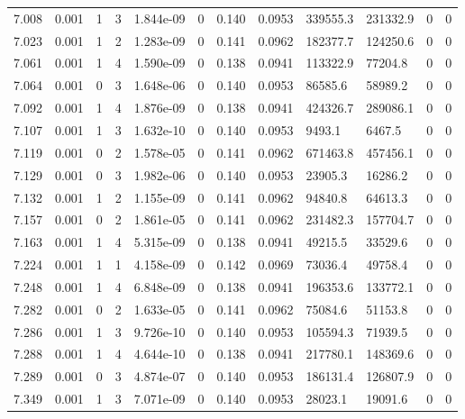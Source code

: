 \documentclass[preview]{standalone}
\begin{document}
{{{{{{{{{{\begin{tabular}{L{1.2cm}C{1.2cm} C{0.3cm}C{0.5cm} C{1.4cm}C{1.4cm} C{1.4cm}C{1.4cm} C{1.6cm}C{1.6cm} C{1.6cm}C{1.6cm}}
  7.008  &  0.001  & 1     &  3 &  1.844e-09  & 0  &  0.140&   0.0953& 339555.3 & 231332.9   &  0 & 0  \\ 
  7.023  &  0.001  & 1     &  2 &  1.283e-09  & 0  &  0.141&   0.0962& 182377.7 & 124250.6   &  0 & 0  \\ 
  7.061  &  0.001  & 1     &  4 &  1.590e-09  & 0  &  0.138&   0.0941& 113322.9 & 77204.8   &  0 & 0  \\ 
  7.064  &  0.001  & 0     &  3 &  1.648e-06  & 0  &  0.140&   0.0953& 86585.6 & 58989.2   &  0 & 0  \\ 
  7.092  &  0.001  & 1     &  4 &  1.876e-09  & 0  &  0.138&   0.0941& 424326.7 & 289086.1   &  0 & 0  \\ 
  7.107  &  0.001  & 1     &  3 &  1.632e-10  & 0  &  0.140&   0.0953& 9493.1 & 6467.5   &  0 & 0  \\ 
  7.119  &  0.001  & 0     &  2 &  1.578e-05  & 0  &  0.141&   0.0962& 671463.8 & 457456.1   &  0 & 0  \\ 
  7.129  &  0.001  & 0     &  3 &  1.982e-06  & 0  &  0.140&   0.0953& 23905.3 & 16286.2   &  0 & 0  \\ 
  7.132  &  0.001  & 1     &  2 &  1.155e-09  & 0  &  0.141&   0.0962& 94840.8 & 64613.3   &  0 & 0  \\ 
  7.157  &  0.001  & 0     &  2 &  1.861e-05  & 0  &  0.141&   0.0962& 231482.3 & 157704.7   &  0 & 0  \\ 
  7.163  &  0.001  & 1     &  4 &  5.315e-09  & 0  &  0.138&   0.0941& 49215.5 & 33529.6   &  0 & 0  \\ 
  7.224  &  0.001  & 1     &  1 &  4.158e-09  & 0  &  0.142&   0.0969& 73036.4 & 49758.4   &  0 & 0  \\ 
  7.248  &  0.001  & 1     &  4 &  6.848e-09  & 0  &  0.138&   0.0941& 196353.6 & 133772.1   &  0 & 0  \\ 
  7.282  &  0.001  & 0     &  2 &  1.633e-05  & 0  &  0.141&   0.0962& 75084.6 & 51153.8   &  0 & 0  \\ 
  7.286  &  0.001  & 1     &  3 &  9.726e-10  & 0  &  0.140&   0.0953& 105594.3 & 71939.5   &  0 & 0  \\ 
  7.288  &  0.001  & 1     &  4 &  4.644e-10  & 0  &  0.138&   0.0941& 217780.1 & 148369.6   &  0 & 0  \\ 
  7.289  &  0.001  & 0     &  3 &  4.874e-07  & 0  &  0.140&   0.0953& 186131.4 & 126807.9   &  0 & 0  \\ 
  7.349  &  0.001  & 1     &  3 &  7.071e-09  & 0  &  0.140&   0.0953& 28023.1 & 19091.6   &  0 & 0  \\ 

\end{tabular}}}}}}}}}}}
\end{document}
